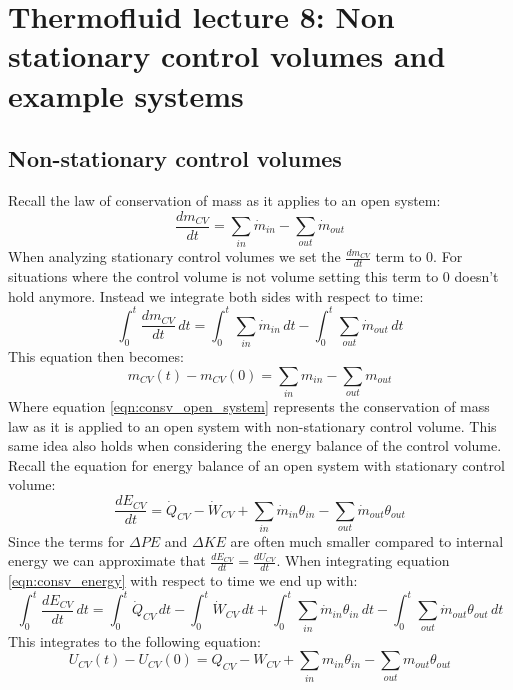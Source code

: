 \documentclass[11pt, a4paper]{article}
\begin{document}
\setcounter{section}{7}
\setcounter{equation}{0}

\section{Thermofluid lecture 8: Non stationary control volumes and example systems}

\subsection{Non-stationary control volumes}
Recall the law of conservation of mass as it applies to an open system:
\begin{equation}
  \frac{dm_{CV}}{dt} = \sum_{in} \dot{m}_{in} - \sum_{out} \dot{m}_{out}
\end{equation}
When analyzing stationary control volumes we set the $\frac{dm_{CV}}{dt}$ term to $0$. For situations where the control volume is not volume setting this term to $0$ doesn't hold anymore. Instead we integrate both sides with respect to time:
\begin{equation*}
  \int_{0}^{t} \frac{dm_{CV}}{dt}\,dt = \int_{0}^{t} \sum_{in} \dot{m}_{in} \, dt - \int_{0}^{t} \sum_{out} \dot{m}_{out} \, dt
\end{equation*}
This equation then becomes:
\begin{equation}
  \label{eqn:consv_open_system}
  m_{CV}(t) - m_{CV}(0) = \sum_{in} m_{in} - \sum_{out} m_{out}
\end{equation}
Where equation \ref{eqn:consv_open_system} represents the conservation of mass law as it is applied to an open system with non-stationary control volume. This same idea also holds when considering the energy balance of the control volume. Recall the equation for energy balance of an open system with stationary control volume:
\begin{equation}
  \label{eqn:consv_energy}
  \frac{dE_{CV}}{dt} = \dot{Q}_{CV} - \dot{W}_{CV} + \sum_{in} \dot{m}_{in} \theta_{in} - \sum_{out} \dot{m}_{out} \theta_{out}
\end{equation}
Since the terms for $\Delta PE$ and $\Delta KE$ are often much smaller compared to internal energy we can approximate that $\frac{dE_{CV}}{dt} = \frac{dU_{CV}}{dt}$. When integrating equation \ref{eqn:consv_energy} with respect to time we end up with:
\begin{equation*}
  \int_{0}^{t} \frac{dE_{CV}}{dt} \,dt = \int_{0}^{t} \dot{Q}_{CV} \, dt - \int_{0}^{t} \dot{W}_{CV} \, dt + \int_{0}^{t} \sum_{in} \dot{m}_{in} \theta_{in} \, dt - \int_{0}^{t} \sum_{out} \dot{m}_{out} \theta_{out} \, dt
\end{equation*}
This integrates to the following equation:
\begin{equation}
  U_{CV}(t) - U_{CV}(0) = Q_{CV} - W_{CV} + \sum_{in} m_{in} \theta_{in} - \sum_{out} m_{out} \theta_{out}  
\end{equation}
\end{document}
